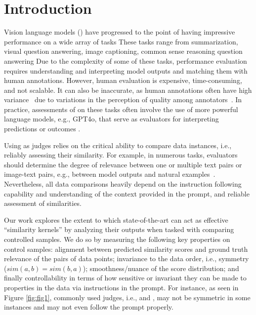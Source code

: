 \vspace{-2pt}
\section{Introduction}
\vspace{-2pt}



Vision language models (\modelss{}) have progressed to the point of having impressive performance on a wide array of tasks \cite{achiam2023gpt,laurenccon2024matters,  reid2024gemini, abdin2024phi, wang2024enhancing,llama3}
These tasks range from summarization, visual question answering, image captioning, common sense reasoning question answering \cite{kembhavi2016diagram, johnson2017clevr, zellers2019recognition, lu2023mathvista, chen2024we, liu2025mmbench} 
Due to the complexity of some of these tasks, performance evaluation requires understanding and interpreting model outputs and matching them with human annotations. 
However, human evaluation is expensive, time-consuming, and not scalable. It can also be inaccurate, as human annotations often have high variance~\citep{liu2019user, knox2024models} due to variations in the perception of quality among annotators~\citep{feng2024sample}. 
In practice, assessments of \modelss{} on these tasks often involve the use of more powerful language models, e.g., GPT4o, that serve as evaluators for interpreting predictions or outcomes \cite{manas2024improving, liu2024visual, liu2025mmbench}.


Using \modelss{} as judges relies on the critical ability to compare data instances, i.e., reliably assessing their similarity. 
For example, in numerous tasks, \model{} evaluators should determine the degree of relevance between one or multiple text pairs or image-text pairs, e.g., between model outputs and natural examples~\citep{liu2025mmbench}. 
Nevertheless, all data comparisons heavily depend on the \model{} instruction following capability and understanding of the context provided in the prompt, and reliable assessment of similarities. 

Our work explores the extent to which state-of-the-art \modelss{} can act as effective ``similarity kernels'' by analyzing their outputs when tasked with comparing controlled samples.
We do so by measuring the following key properties on control samples: 
alignment between predicted similarity scores and ground truth relevance of the pairs of data points; invariance to the data order, i.e., symmetry ($sim(a, b)=sim(b,a)$); smoothness/nuance of the score distribution; and finally controllability in terms of how sensitive or invariant they can be made to properties in the data via instructions in the prompt.
For instance, as seen in Figure \ref{fig:fig1}, commonly used \model{} judges, i.e., \gptFouroEleven{} and \geminiPro{}, may not be symmetric in some instances and may not even follow the prompt properly.

